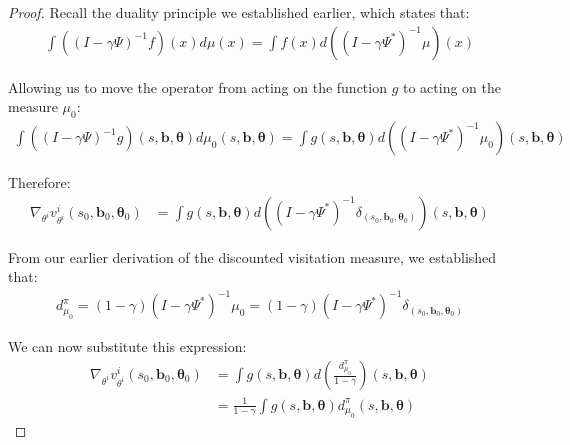 \documentclass[a4paper,12pt]{report}
\begin{document}
\begin{proof}
    Recall the duality principle we established earlier, which states that:
    \begin{align}
        \int ((I - \gamma \Psi)^{-1}f)(x) d\mu(x) = \int f(x) d((I - \gamma \Psi^{*})^{-1}\mu)(x)
    \end{align}

    Allowing us to move the operator from acting on the function $g$ to acting on
    the measure $\mu_{0}$:
    \begin{align}
        \int ((I - \gamma \Psi)^{-1}g)(s, \boldsymbol{b}, \boldsymbol{\theta}) d\mu_{0}(s, \boldsymbol{b}, \boldsymbol{\theta}) = \int g(s, \boldsymbol{b}, \boldsymbol{\theta}) d((I - \gamma \Psi^{*})^{-1}\mu_{0})(s, \boldsymbol{b}, \boldsymbol{\theta})
    \end{align}

    Therefore:
    \begin{align}
        \nabla_{\theta^i}v^{i}_{\theta^i}(s_{0}, \boldsymbol{b}_{0}, \boldsymbol{\theta}_{0}) & = \int g(s, \boldsymbol{b}, \boldsymbol{\theta}) d((I - \gamma \Psi^{*})^{-1}\delta_{(s_0, \boldsymbol{b}_0, \boldsymbol{\theta}_0)})(s, \boldsymbol{b}, \boldsymbol{\theta})
    \end{align}

    From our earlier derivation of the discounted visitation measure, we established
    that:
    \begin{align}
        d^{\pi}_{\mu_0}= (1-\gamma)(I - \gamma \Psi^{*})^{-1}\mu_{0} = (1-\gamma)(I - \gamma \Psi^{*})^{-1}\delta_{(s_0, \boldsymbol{b}_0, \boldsymbol{\theta}_0)}
    \end{align}

    We can now substitute this expression:
    \begin{align}
        \nabla_{\theta^i}v^{i}_{\theta^i}(s_{0}, \boldsymbol{b}_{0}, \boldsymbol{\theta}_{0}) & = \int g(s, \boldsymbol{b}, \boldsymbol{\theta}) d\left(\frac{d^{\pi}_{\mu_0}}{1-\gamma}\right)(s, \boldsymbol{b}, \boldsymbol{\theta}) \\
                                                                                              & = \frac{1}{1-\gamma}\int g(s, \boldsymbol{b}, \boldsymbol{\theta}) d^{\pi}_{\mu_0}(s, \boldsymbol{b}, \boldsymbol{\theta})
    \end{align}


\end{proof}
\end{document}
